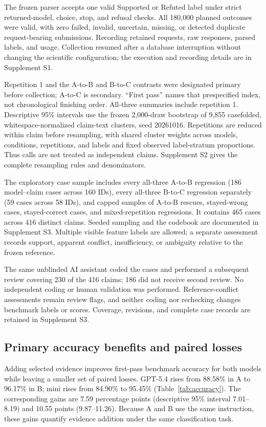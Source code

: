 \documentclass[11pt,letterpaper]{article}
\begin{document}
The frozen parser accepts one valid Supported or Refuted label under strict returned-model, choice, stop, and refusal checks. All 180,000 planned outcomes were valid, with zero failed, invalid, uncertain, missing, or detected duplicate request-bearing submissions. Recording retained requests, raw responses, parsed labels, and usage. Collection resumed after a database interruption without changing the scientific configuration; the execution and recording details are in Supplement S1.

Repetition 1 and the A-to-B and B-to-C contrasts were designated primary before collection; A-to-C is secondary. ``First pass'' names that prespecified index, not chronological finishing order. All-three summaries include repetition 1. Descriptive 95\% intervals use the frozen 2,000-draw bootstrap of 9,855 casefolded, whitespace-normalized claim-text clusters, seed 20261016. Repetitions are reduced within claim before resampling, with shared cluster weights across models, conditions, repetitions, and labels and fixed observed label-stratum proportions. Thus calls are not treated as independent claims. Supplement S2 gives the complete resampling rules and denominators.

The exploratory case sample includes every all-three A-to-B regression (186 model--claim cases across 160 IDs), every all-three B-to-C regression separately (59 cases across 58 IDs), and capped samples of A-to-B rescues, stayed-wrong cases, stayed-correct cases, and mixed-repetition regressions. It contains 465 cases across 416 distinct claims. Seeded sampling and the codebook are documented in Supplement S3. Multiple visible feature labels are allowed; a separate assessment records support, apparent conflict, insufficiency, or ambiguity relative to the frozen reference.

The same unblinded AI assistant coded the cases and performed a subsequent review covering 230 of the 416 claims; 186 did not receive second review. No independent coding or human validation was performed. Reference-conflict assessments remain review flags, and neither coding nor rechecking changes benchmark labels or scores. Coverage, revisions, and complete case records are retained in Supplement S3.

\subsection{Primary accuracy benefits and paired losses}\label{sec:primary}
Adding selected evidence improves first-pass benchmark accuracy for both models while leaving a smaller set of paired losses. GPT-5.4 rises from 88.58\% in A to 96.17\% in B; mini rises from 84.90\% to 95.45\% (Table~\ref{tab:accuracy}). The corresponding gains are 7.59 percentage points (descriptive 95\% interval 7.01--8.19) and 10.55 points (9.87--11.26). Because A and B use the same instruction, these gains quantify evidence addition under the same classification task.
\end{document}
